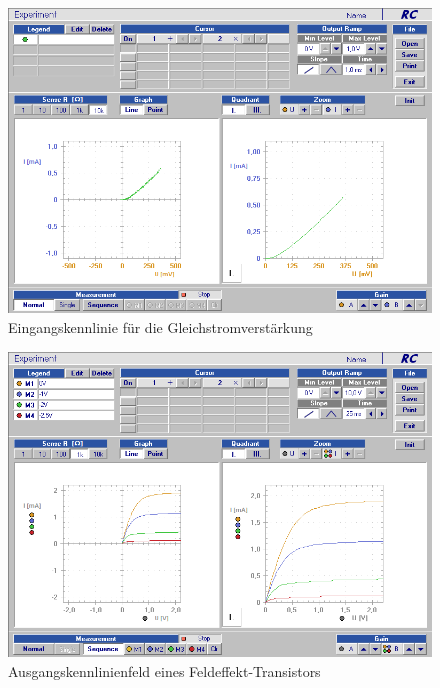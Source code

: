 \documentclass[12pt,a4paper]{article}
\begin{document}
\begin{figure}[H]
	\centering
	\includegraphics[scale=0.5]{./data/Braun_Kurz_PS8/Gleichstromverstaerkung.png}
	\caption{Eingangskennlinie für die Gleichstromverstärkung}
	\label{fig:eingangsskennlinien}
\end{figure}

\begin{figure}[H]
	\centering
	\includegraphics[scale=0.5]{./data/Braun_Kurz_PS8/FET_Ausgangskennlinien.png}
	\caption{Ausgangskennlinienfeld eines Feldeffekt-Transistors}
	\label{fig:ausgangskennlinienfeld_fet}
\end{figure}
\end{document}
